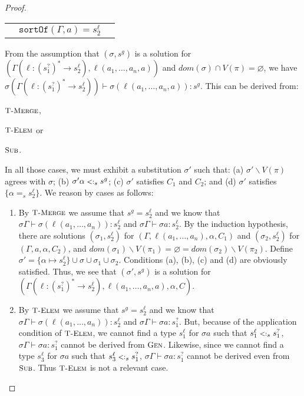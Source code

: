 \documentclass{eptcs}
\newcommand{\ih}{induction hypothesis\xspace}
\newcommand{\CC}{\ensuremath{C}\xspace}
\newcommand{\TElem}{{\small \textsc{T-Elem}}}
\newcommand{\TMerge}{{\small \textsc{T-Merge}}}
\newcommand{\Sub}{{\small \textsc{Sub}}}
\newcommand{\Gen}{{\small \textsc{Gen}}}
\newcommand{\sub}{\mathrel{\mbox{{\footnotesize $<:$}}}}
\newcommand{\sortof}[2]{\texttt{sortOf}\ensuremath{(#1,#2)}}
\newcommand{\vsig}[2]{\ensuremath{{#1}^*\rightarrow{#2}}}
\begin{document}
\begin{proof}
\begin{flushleft}
\begin{tabular}{lll}
                                & $\sortof{\Gamma}{a} = s_2^{\ell}$ & \\
\end{tabular}
\end{flushleft}

From the assumption that $(\sigma,s^g)$ is a solution for $(\Gamma(\ell :
\vsig{(s_1^?)}{s_2^{\ell}}), \ell(a_1,\ldots,a_n,a))$ and $dom(\sigma) \cap V(\pi) = \varnothing$, we have
$\sigma(\Gamma(\ell : \vsig{(s_1^?)}{s_2^{\ell}})) \vdash \sigma(\ell(a_1, \dots, a_n,
a)) : s^g$. This can be derived from:
\begin{inparaenum}[1)] 
\item $\TMerge$,
\item $\TElem$ or
\item $\Sub$. 
\end{inparaenum}
In all those cases, we must exhibit a substitution $\sigma'$ such that: (a) $\sigma'
\backslash V(\pi)$ agrees with $\sigma$; (b) $\sigma'\alpha \sub_s s^g$; (c) $\sigma'$
satisfies $\CC_1$ and $\CC_2$; and (d) $\sigma'$ satisfies $\{\alpha =_s
s_2^{\ell}\}$. We reason by cases as follows:  

\begin{enumerate}
\item By $\TMerge$ we assume that $s^g = s_2^{\ell}$ and we know that
$\sigma\Gamma \vdash \sigma(\ell(a_1,\ldots,a_n)):
s_2^{\ell}$ and $\sigma\Gamma \vdash \sigma a : s_2^{\ell}$. By the \ih, there are
solutions $(\sigma_1,s_2^{\ell})$ for $(\Gamma, \ell(a_1,\ldots,a_n), \alpha, \CC_1)$
and $(\sigma_2,s_2^{\ell})$ for $(\Gamma,a,\alpha,\CC_2)$, and
$dom(\sigma_1) \backslash V(\pi_1) = \varnothing = dom(\sigma_2) \backslash
V(\pi_2)$. Define $\sigma' = \{\alpha \mapsto s_2^{\ell}\}
\cup \sigma \cup \sigma_1 \cup \sigma_2$. Conditions (a), (b), (c) and (d) are obviously satisfied. Thus, we
see that $(\sigma',s^g)$ is a solution for $(\Gamma(\ell :
\vsig{(s_1^?)}{s_2^{\ell}}), \ell(a_1,\ldots,a_n,a), \alpha, \CC)$.

\item By $\TElem$ we assume that $s^g = s_2^{\ell}$ and we know that
$\sigma\Gamma \vdash \sigma(\ell(a_1,\ldots,a_n)):
s_2^{\ell}$ and $\sigma\Gamma \vdash \sigma a : s_1^?$. But, because of the
application condition of $\TElem$, we cannot find a type $s_1^{\ell}$ for
$\sigma a$ such that $s_1^{\ell} \sub_s s_1^?$, $\sigma\Gamma \vdash \sigma a :
s_1^?$ cannot be derived from $\Gen$. Likewise, since we cannot find a type
$s_3^{\ell}$ for $\sigma a$ such that $s_3^{\ell} \sub_s s_1^?$, $\sigma\Gamma \vdash \sigma a :
s_1^?$ cannot be derived even from $\Sub$. Thus $\TElem$ is not a relevant case.


\end{enumerate}
\end{proof}
\end{document}
